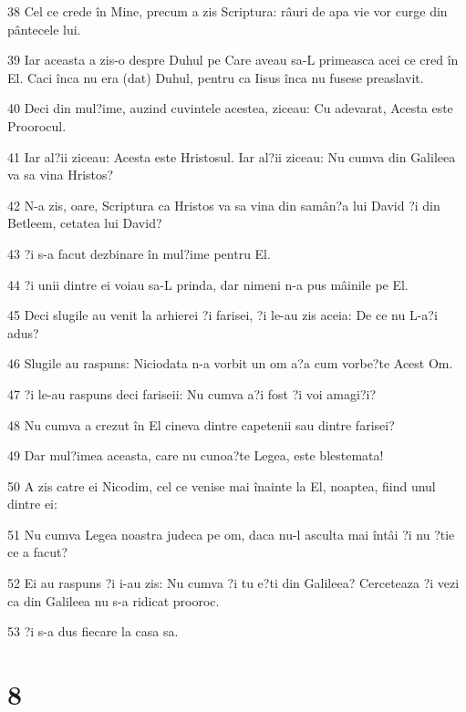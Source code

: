 \par 38 Cel ce crede în Mine, precum a zis Scriptura: râuri de apa vie vor curge din pântecele lui.
\par 39 Iar aceasta a zis-o despre Duhul pe Care aveau sa-L primeasca acei ce cred în El. Caci înca nu era (dat) Duhul, pentru ca Iisus înca nu fusese preaslavit.
\par 40 Deci din mul?ime, auzind cuvintele acestea, ziceau: Cu adevarat, Acesta este Proorocul.
\par 41 Iar al?ii ziceau: Acesta este Hristosul. Iar al?ii ziceau: Nu cumva din Galileea va sa vina Hristos?
\par 42 N-a zis, oare, Scriptura ca Hristos va sa vina din samân?a lui David ?i din Betleem, cetatea lui David?
\par 43 ?i s-a facut dezbinare în mul?ime pentru El.
\par 44 ?i unii dintre ei voiau sa-L prinda, dar nimeni n-a pus mâinile pe El.
\par 45 Deci slugile au venit la arhierei ?i farisei, ?i le-au zis aceia: De ce nu L-a?i adus?
\par 46 Slugile au raspuns: Niciodata n-a vorbit un om a?a cum vorbe?te Acest Om.
\par 47 ?i le-au raspuns deci fariseii: Nu cumva a?i fost ?i voi amagi?i?
\par 48 Nu cumva a crezut în El cineva dintre capetenii sau dintre farisei?
\par 49 Dar mul?imea aceasta, care nu cunoa?te Legea, este blestemata!
\par 50 A zis catre ei Nicodim, cel ce venise mai înainte la El, noaptea, fiind unul dintre ei:
\par 51 Nu cumva Legea noastra judeca pe om, daca nu-l asculta mai întâi ?i nu ?tie ce a facut?
\par 52 Ei au raspuns ?i i-au zis: Nu cumva ?i tu e?ti din Galileea? Cerceteaza ?i vezi ca din Galileea nu s-a ridicat prooroc.
\par 53 ?i s-a dus fiecare la casa sa.

\chapter{8}

